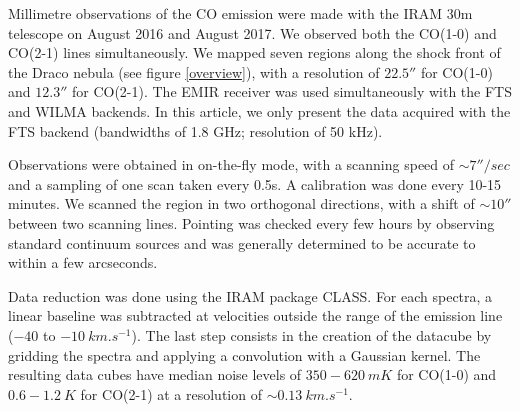 \documentclass[traditabstract]{aa}
\begin{document}
   Millimetre observations of the CO emission were made with the IRAM 30m telescope on August 2016 and August 2017. We observed both the CO(1-0) and CO(2-1) lines simultaneously. We mapped seven regions along the shock front of the Draco nebula (see figure \ref{overview}), with a resolution of $22.5''$ for CO(1-0) and $12.3''$ for CO(2-1). The EMIR receiver was used simultaneously with the FTS and WILMA backends. In this article, we only present the data acquired with the FTS backend (bandwidths of 1.8 GHz; resolution of 50 kHz).

   Observations were obtained in on-the-fly mode, with a scanning speed of $\sim 7''/sec$ and a sampling of one scan taken every 0.5s. A calibration was done every 10-15 minutes. We scanned the region in two orthogonal directions, with a shift of $\sim 10''$ between two scanning lines. Pointing was checked every few hours by observing standard continuum sources and was generally determined to be accurate to within a few arcseconds.

   Data reduction was done using the IRAM package CLASS. For each spectra, a linear baseline was subtracted at velocities outside the range of the emission line ($-40$ to $-10\: km.s^{-1}$). The last step consists in the creation of the datacube by gridding the spectra and applying a convolution with a Gaussian kernel. The resulting data cubes have median noise levels of $350-620\: mK$ for CO(1-0) and $0.6-1.2\: K$ for CO(2-1) at a resolution of $\sim 0.13\: km.s^{-1}$.
\end{document}
